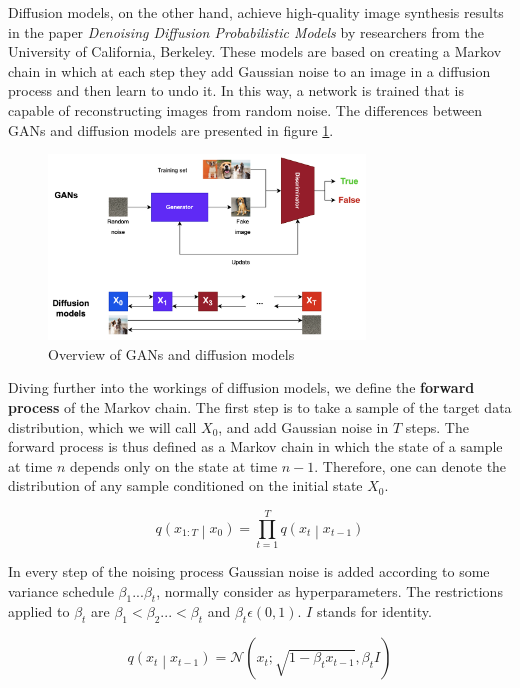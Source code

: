 Diffusion models, on the other hand, achieve high-quality image synthesis results in the paper \textit{Denoising Diffusion Probabilistic Models} \cite{ho2020denoising} by researchers from the University of California, Berkeley. These models are based on creating a Markov chain in which at each step they add Gaussian noise to an image in a diffusion process and then learn to undo it. In this way, a network is trained that is capable of reconstructing images from random noise. The differences between GANs and diffusion models are presented in figure \ref{fig:GansvsDM}.

\begin{figure}
    \centering
    \includegraphics[width=0.75\textwidth]{Pictures/GansvsDM} 
    \caption{Overview of GANs and diffusion models}
    \label{fig:GansvsDM}
\end{figure}

Diving further into the workings of diffusion models, we define the \textbf{forward process} of the Markov chain. The first step is to take a sample of the target data distribution, which we will call $X_0$, and add Gaussian noise in $T$ steps. The forward process is thus defined as a Markov chain in which the state of a sample at time $n$ depends only on the state at time $n-1$. Therefore, one can denote the distribution of any sample conditioned on the initial state $X_0$.

\[ q\left(x_{1:T}\middle| x_0\right)=\prod_{t=1}^{T}{q\left(x_t\middle| x_{t-1}\right)} \]

In every step of the noising process Gaussian noise is added according to some variance schedule $\beta_1...\beta_t$, normally consider as hyperparameters. The restrictions applied to $\beta_t$ are $\beta_1 < \beta_2 ... < \beta_t$ and $\beta_t \epsilon (0, 1)$. $I$ stands for identity.

\[q\left(x_t\middle| x_{t-1}\right)=\mathcal{N}\left(x_t;\sqrt{1-\beta_tx_{t-1}},\beta_tI\right) \]

